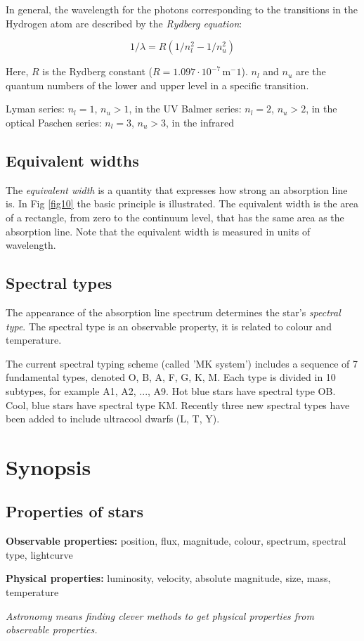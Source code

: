 In general, the wavelength for the photons corresponding to the transitions in the Hydrogen atom are described by the \textit{Rydberg equation}:

\begin{equation}
1/\lambda = R (1/n_l^2 - 1/n_u^2)
\label{eq21}
\end{equation}

Here, $R$ is the Rydberg constant ($R = 1.097 \cdot 10^{-7}$\,m${^-1}$). $n_l$ and $n_u$ are the quantum numbers of the lower and upper level in a specific transition.

Lyman series: $n_l = 1$, $n_u >1$, in the UV
Balmer series: $n_l = 2$, $n_u >2$, in the optical
Paschen series: $n_l = 3$, $n_u >3$, in the infrared



\subsection{Equivalent widths}

The \textit{equivalent width} is a quantity that expresses how strong an absorption line is. In Fig \ref{fig10} the basic principle is illustrated. The equivalent width is the area of a rectangle, from zero to the continuum level, that has the same area as the absorption line. Note that the equivalent width is measured in units of wavelength.

\subsection{Spectral types}

The appearance of the absorption line spectrum determines the star's \textit{spectral type}. The spectral type is an observable property, it is related to colour and temperature.

The current spectral typing scheme (called 'MK system') includes a sequence of 7 fundamental types, denoted O, B, A, F, G, K, M. Each type is divided in 10 subtypes, for example A1, A2, ..., A9. Hot blue stars have spectral type OB. Cool, blue stars have spectral type KM. Recently three new spectral types have been added to include ultracool dwarfs (L, T, Y).

\section{Synopsis}

\subsection{Properties of stars}

\textbf{Observable properties:} position, flux, magnitude, colour, spectrum, spectral type, lightcurve

\textbf{Physical properties:} luminosity, velocity, absolute magnitude, size, mass, temperature

\textit{Astronomy means finding clever methods to get physical properties from observable properties.}

